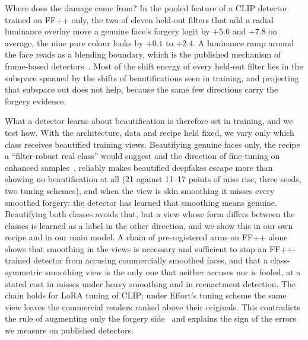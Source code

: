 \documentclass[conference]{IEEEtran}
\begin{document}
Where does the damage come from? In the pooled feature of a CLIP detector trained on FF++ only, the two of eleven
held-out filters that add a radial luminance overlay move a genuine face's forgery logit by $+5.6$ and $+7.8$ on
average, the nine pure colour looks by $+0.1$ to $+2.4$. A luminance ramp around the face reads as a blending boundary,
which is the published mechanism of frame-based detectors~\cite{alphablend2026}. Most of the shift energy of every
held-out filter lies in the subspace spanned by the shifts of beautifications seen in training, and projecting that
subspace out does not help, because the same few directions carry the forgery evidence.

What a detector learns about beautification is therefore set in training, and we test how. With the architecture, data
and recipe held fixed, we vary only which class receives beautified training views. Beautifying genuine faces only, the
recipe a ``filter-robust real class'' would suggest and the direction of fine-tuning on enhanced samples~\cite{saeed2025},
reliably makes beautified deepfakes escape more than showing no beautification at all (21 against 11--17 points of miss
rise, three seeds, two tuning schemes), and when the view is skin smoothing it misses every smoothed forgery: the
detector has learned that smoothing means genuine. Beautifying both classes avoids that, but a view whose form differs
between the classes is learned as a label in the other direction, and we show this in our own recipe and in our main
model. A chain of pre-registered arms on FF++ alone shows that smoothing in the views is necessary and sufficient to
stop an FF++-trained detector from accusing commercially smoothed faces, and that a class-symmetric smoothing view is
the only one that neither accuses nor is fooled, at a stated cost in misses under heavy smoothing and in reenactment
detection. The chain holds for LoRA tuning of CLIP; under Effort's tuning scheme the same view leaves the commercial
renders ranked above their originals. This contradicts the rule of augmenting only the forgery side~\cite{lsda} and
explains the sign of the errors we measure on published detectors.
\end{document}

